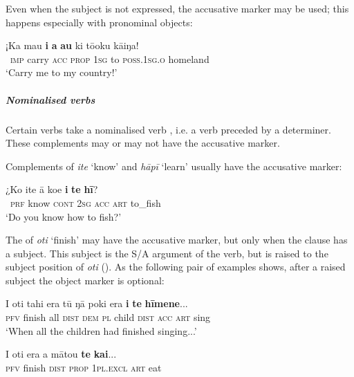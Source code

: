 Even when the subject is not expressed, the accusative marker may be used; this happens especially with pronominal objects:

\ea\label{ex:8.34}
\gll ¡Ka ma{\ꞌ}u \textbf{i} \textbf{a} \textbf{au} ki tō{\ꞌ}oku kāiŋa!\\
~\textsc{imp} carry \textsc{acc} \textsc{prop} \textsc{1sg} to \textsc{poss.1sg.o} homeland\\

\glt 
‘Carry me to my country!’ \textstyleExampleref{[Ley-9-55.089]}
\z

\subparagraph{Nominalised verbs} Certain verbs take a nominalised verb , i.e. a verb preceded by a determiner. These complements may or may not have the accusative marker.

Complements of \textit{{\ꞌ}ite} ‘know’ and \textit{hāpī} ‘learn’ usually have the accusative marker:

\ea\label{ex:8.35}
\gll ¿Ko {\ꞌ}ite {\ꞌ}ā koe \textbf{i} \textbf{te} \textbf{hī}?\\
~\textsc{prf} know \textsc{cont} \textsc{2sg} \textsc{acc} \textsc{art} to\_fish\\

\glt
‘Do you know how to fish?’ \textstyleExampleref{[R245.101]} 
\z

The  of \textit{oti} ‘finish’ may have the accusative marker, but only when the clause has a subject. This subject is the S/A argument of the  verb, but is raised to the subject position of \textit{oti} (). As the following pair of examples shows, after a raised subject the object marker is optional:

\ea\label{ex:8.36}
\gll I oti tahi era tū ŋā poki era \textbf{i} \textbf{te} \textbf{hīmene}...\\
\textsc{pfv} finish all \textsc{dist} \textsc{dem} \textsc{pl} child \textsc{dist} \textsc{acc} \textsc{art} sing\\

\glt 
‘When all the children had finished singing...’ \textstyleExampleref{[R315.353]} 
\z

\ea\label{ex:8.37}
\gll I oti era a mātou \textbf{te} \textbf{kai}...\\
\textsc{pfv} finish \textsc{dist} \textsc{prop} \textsc{1pl.excl} \textsc{art} eat\\

